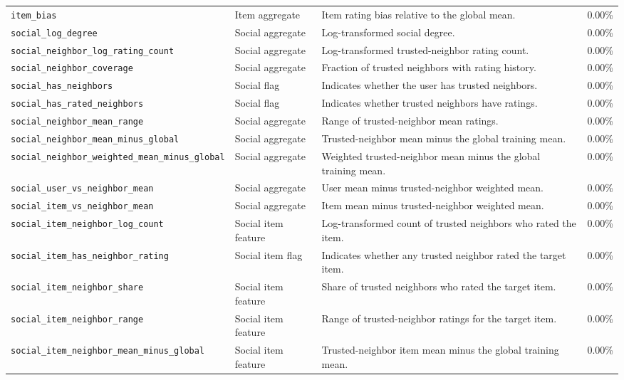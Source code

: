 \documentclass[conference]{IEEEtran}
\begin{document}
\begin{table}[htbp]
\begin{tabular}{p{6.5cm}p{2.4cm}p{7.1cm}p{1.3cm}}
\raggedright\texttt{item\_bias} & Item aggregate & Item rating bias relative to the global mean. & 0.00\% \\
\raggedright\texttt{social\_log\_degree} & Social aggregate & Log-transformed social degree. & 0.00\% \\
\raggedright\texttt{social\_neighbor\_log\_rating\_count} & Social aggregate & Log-transformed trusted-neighbor rating count. & 0.00\% \\
\raggedright\texttt{social\_neighbor\_coverage} & Social aggregate & Fraction of trusted neighbors with rating history. & 0.00\% \\
\raggedright\texttt{social\_has\_neighbors} & Social flag & Indicates whether the user has trusted neighbors. & 0.00\% \\
\raggedright\texttt{social\_has\_rated\_neighbors} & Social flag & Indicates whether trusted neighbors have ratings. & 0.00\% \\
\raggedright\texttt{social\_neighbor\_mean\_range} & Social aggregate & Range of trusted-neighbor mean ratings. & 0.00\% \\
\raggedright\texttt{social\_neighbor\_mean\_minus\_global} & Social aggregate & Trusted-neighbor mean minus the global training mean. & 0.00\% \\
\raggedright\texttt{social\_neighbor\_weighted\_mean\_minus\_global} & Social aggregate & Weighted trusted-neighbor mean minus the global training mean. & 0.00\% \\
\raggedright\texttt{social\_user\_vs\_neighbor\_mean} & Social aggregate & User mean minus trusted-neighbor weighted mean. & 0.00\% \\
\raggedright\texttt{social\_item\_vs\_neighbor\_mean} & Social aggregate & Item mean minus trusted-neighbor weighted mean. & 0.00\% \\
\raggedright\texttt{social\_item\_neighbor\_log\_count} & Social item feature & Log-transformed count of trusted neighbors who rated the item. & 0.00\% \\
\raggedright\texttt{social\_item\_has\_neighbor\_rating} & Social item flag & Indicates whether any trusted neighbor rated the target item. & 0.00\% \\
\raggedright\texttt{social\_item\_neighbor\_share} & Social item feature & Share of trusted neighbors who rated the target item. & 0.00\% \\
\raggedright\texttt{social\_item\_neighbor\_range} & Social item feature & Range of trusted-neighbor ratings for the target item. & 0.00\% \\
\raggedright\texttt{social\_item\_neighbor\_mean\_minus\_global} & Social item feature & Trusted-neighbor item mean minus the global training mean. & 0.00\% \\
\bottomrule
\end{tabular}
\end{table}
\end{document}
